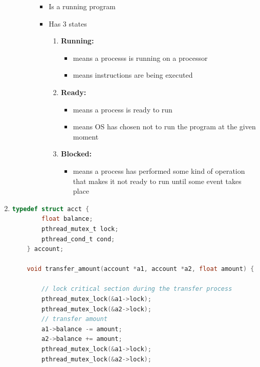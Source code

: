 \documentclass[12pt]{article}
\begin{document}
\begin{enumerate}[1.]
\begin{enumerate}[a)]
\begin{itemize}
            \begin{itemize}
                \item Is a running program
                \item Has 3 states
                \begin{enumerate}[1.]
                    \item \textbf{Running:}
                    \begin{itemize}
                        \item means a processs is running on a processor
                        \item means instructions are being executed
                    \end{itemize}
                    \item \textbf{Ready:}
                    \begin{itemize}
                        \item means a process is ready to run
                        \item means OS has chosen not to run the program at the given moment
                    \end{itemize}
                    \item \textbf{Blocked:}
                    \begin{itemize}
                        \item means a process has performed some kind of operation that makes it not ready to run
                        until some event takes place
                    \end{itemize}
                \end{enumerate}
            \end{itemize}
        \end{itemize}
    \end{enumerate}

    \item

\begin{lstlisting}[language=c]
    typedef struct acct {
        float balance;
        pthread_mutex_t lock;
        pthread_cond_t cond;
    } account;

    void transfer_amount(account *a1, account *a2, float amount) {

        // lock critical section during the transfer process
        pthread_mutex_lock(&a1->lock);
        pthread_mutex_lock(&a2->lock);
        // transfer amount
        a1->balance -= amount;
        a2->balance += amount;
        pthread_mutex_lock(&a1->lock);
        pthread_mutex_lock(&a2->lock);


\end{lstlisting}
\end{enumerate}
\end{document}
